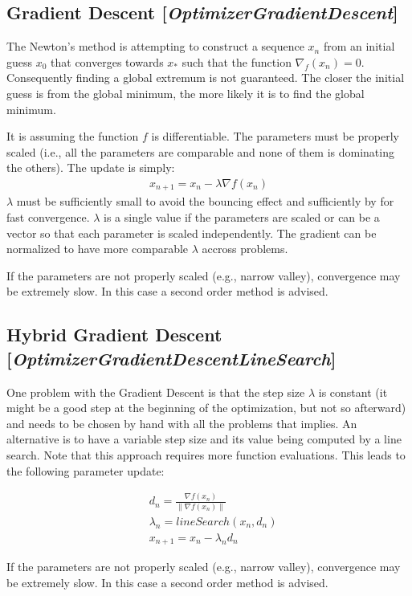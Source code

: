 \documentclass[11pt]{article}
\newcommand{\nllref}[1]{[\small{\textit{#1}}]}
\begin{document}
\subsection{Gradient Descent \nllref{OptimizerGradientDescent}}
The Newton's method is attempting to construct a sequence $x_n$ from an initial guess $x_0$ that converges towards $x_*$ such that the function $\nabla_f(x_n)=0$. Consequently finding a global extremum is not guaranteed. The closer the initial guess is from the global minimum, the more likely it is to find the global minimum.

It is assuming the function $f$ is differentiable. The parameters must be properly scaled (i.e., all the parameters are comparable and none of them is dominating the others). The update is simply:
\begin{align}
x_{n+1} = x_n - \lambda \nabla{f}(x_n) \label{gradientstep}
\end{align}
$\lambda$ must be sufficiently small to avoid the bouncing effect and sufficiently by for fast convergence. $\lambda$ is a single value if the parameters are scaled or can be a vector so that each parameter is scaled independently. The gradient can be normalized to have more comparable $\lambda$ accross problems.

If the parameters are not properly scaled (e.g., narrow valley), convergence may be extremely slow. In this case a second order method is advised.

\subsection{Hybrid Gradient Descent \nllref{OptimizerGradientDescentLineSearch}}
One problem with the Gradient Descent is that the step size $\lambda$ is constant (it might be a good step at the beginning of the optimization, but not so afterward) and needs to be chosen by hand with all the problems that implies. An alternative is to have a variable step size and its value being computed by a line search. Note that this approach requires more function evaluations. This leads to the following parameter update:

\begin{align}
& d_n = \frac{\nabla{f}(x_n)}{\lVert \nabla{f}(x_n) \lVert} \nonumber\\
& \lambda_n = lineSearch(x_n, d_n) \nonumber\\
& x_{n+1} = x_n - \lambda _n d_n
\end{align}

If the parameters are not properly scaled (e.g., narrow valley), convergence may be extremely slow. In this case a second order method is advised.
\end{document}
